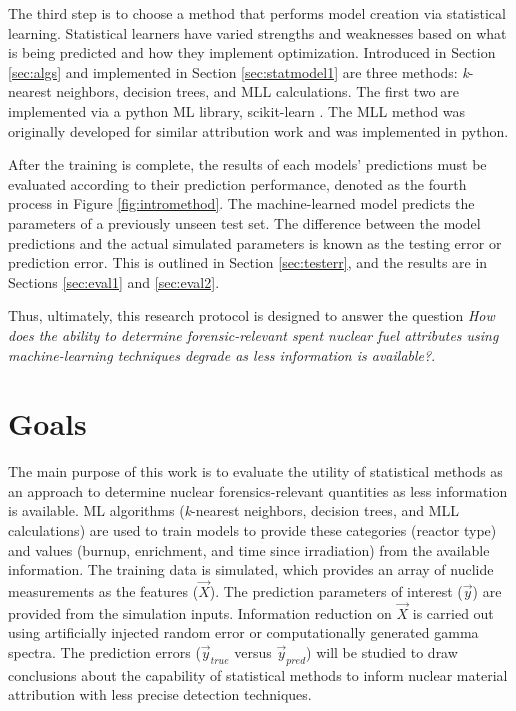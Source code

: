 The third step is to choose a method that performs model creation via
statistical learning.  Statistical learners have varied strengths and
weaknesses based on what is being predicted and how they implement
optimization. Introduced in Section \ref{sec:algs} and implemented in Section
\ref{sec:statmodel1} are three methods: \textit{k}-nearest neighbors, decision
trees, and \gls{MLL} calculations. The first two are implemented via a python
\gls{ML} library, scikit-learn \cite{scikit}. The \gls{MLL} method was
originally developed for similar attribution work \cite{mll_method,
mll_sensitivity, mll_validate} and was implemented in python.

After the training is complete, the results of each models' predictions must be
evaluated according to their prediction performance, denoted as the fourth
process in Figure \ref{fig:intromethod}.  The machine-learned model predicts
the parameters of a previously unseen test set.  The difference between the
model predictions and the actual simulated parameters is known as the testing
error or prediction error. This is outlined in Section \ref{sec:testerr}, and
the results are in Sections \ref{sec:eval1} and \ref{sec:eval2}.

Thus, ultimately, this research protocol is designed to answer the question
\textit{How does the ability to determine forensic-relevant spent nuclear fuel
attributes using machine-learning techniques degrade as less information is
available?}. 

\section{Goals}

The main purpose of this work is to evaluate the utility of statistical methods
as an approach to determine nuclear forensics-relevant quantities as less
information is available. \Gls{ML} algorithms (\textit{k}-nearest neighbors,
decision trees, and \gls{MLL} calculations) are used to train models to provide
these categories (reactor type) and values (burnup, enrichment, and time since
irradiation) from the available information.  The training data is simulated,
which provides an array of nuclide measurements as the features ($\vec{X}$).
The prediction parameters of interest ($\vec{y}$) are provided from the
simulation inputs. Information reduction on $\vec{X}$ is carried out using
artificially injected random error or computationally generated gamma spectra.
The prediction errors ($\vec{y}_{true}$ versus $\vec{y}_{pred}$) will be
studied to draw conclusions about the capability of statistical methods to
inform nuclear material attribution with less precise detection techniques.

